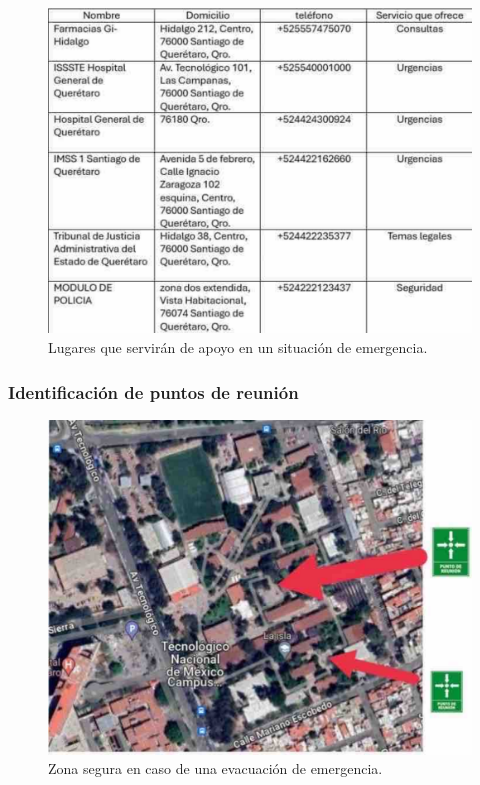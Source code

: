     \begin{figure}[H]
        \centering
        \includegraphics[trim = {1mm 1mm 1mm 1mm},clip,scale=0.3]{8/Img/Apoyos exteriores.pdf}
        \caption{ Lugares que servirán de apoyo en un situación de emergencia.}
        \label{Apoyos Exteriores}
    \end{figure}
    \subsubsection{Identificación de puntos de reunión}
    \begin{figure}[H]
        \centering
        \includegraphics[trim = {1mm 1mm 1mm 1mm},clip,scale=0.3]{8/Img/Puntos de reunion.pdf}
        \caption{Zona segura en caso de una evacuación de emergencia.}
        \label{Puntos de reuinion}
    \end{figure}
